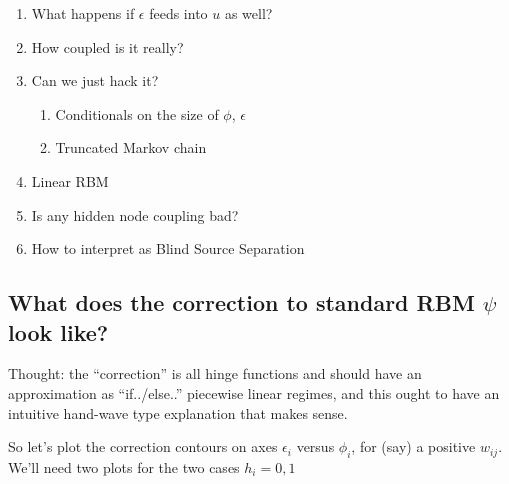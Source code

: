 \documentclass{article}
\begin{document}
    \begin{enumerate}
\def\labelenumi{\arabic{enumi})}
\itemsep1pt\parskip0pt
\item
  What happens if \(\epsilon\) feeds into \(u\) as well?
\item
  How coupled is it really?
\item
  Can we just hack it?

  \begin{enumerate}
  \def\labelenumii{\alph{enumii})}
  \itemsep1pt\parskip0pt
  \item
    Conditionals on the size of \(\phi\), \(\epsilon\)
  \item
    Truncated Markov chain
  \end{enumerate}
\item
  Linear RBM
\item
  Is any hidden node coupling bad?
\item
  How to interpret as Blind Source Separation
\end{enumerate}

    \subsection{\texorpdfstring{What does the correction to standard RBM
\(\psi\) look
like?}{What does the correction to standard RBM \textbackslash{}psi look like?}}\label{what-does-the-correction-to-standard-rbm-psi-look-like}

Thought: the ``correction'' is all hinge functions and should have an
approximation as ``if../else..'' piecewise linear regimes, and this
ought to have an intuitive hand-wave type explanation that makes sense.

So let's plot the correction contours on axes \(\epsilon_i\) versus
\(\phi_i\), for (say) a positive \(w_{ij}\). We'll need two plots for
the two cases \(h_i=0,1\)
\end{document}
